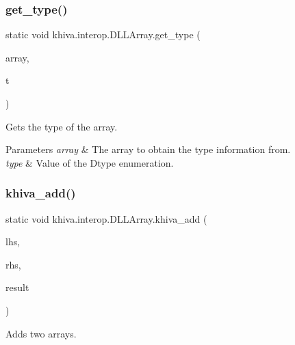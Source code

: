 \subsubsection{\texorpdfstring{get\+\_\+type()}{get\_type()}}
{\footnotesize\ttfamily static void khiva.\+interop.\+D\+L\+L\+Array.\+get\+\_\+type (\begin{DoxyParamCaption}\item[{\mbox{[}\+In\mbox{]} ref Int\+Ptr}]{array,  }\item[{\mbox{[}\+Out\mbox{]} out int}]{t }\end{DoxyParamCaption})\hspace{0.3cm}{\ttfamily [static]}}



Gets the type of the array.


\begin{DoxyParams}{Parameters}
{\em array} & The array to obtain the type information from.\\
\hline
{\em type} & Value of the Dtype enumeration.\\
\hline
\end{DoxyParams}
\mbox{\label{classkhiva_1_1interop_1_1_d_l_l_array_a4c9506632f032803da33e8de37f8de63}} 
\subsubsection{\texorpdfstring{khiva\+\_\+add()}{khiva\_add()}}
{\footnotesize\ttfamily static void khiva.\+interop.\+D\+L\+L\+Array.\+khiva\+\_\+add (\begin{DoxyParamCaption}\item[{\mbox{[}\+In\mbox{]} ref Int\+Ptr}]{lhs,  }\item[{\mbox{[}\+In\mbox{]} ref Int\+Ptr}]{rhs,  }\item[{\mbox{[}\+Out\mbox{]} out Int\+Ptr}]{result }\end{DoxyParamCaption})\hspace{0.3cm}{\ttfamily [static]}}



Adds two arrays.


